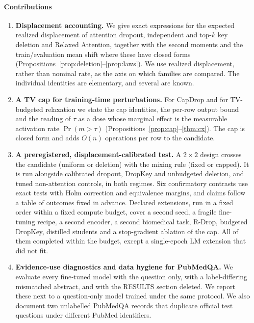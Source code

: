 \paragraph{Contributions}
\begin{enumerate}
\item \textbf{Displacement accounting.} We give exact expressions for the expected realized displacement of
attention dropout, independent and top-$k$ key deletion and Relaxed Attention, together with the
second moments and the train/evaluation mean shift where these have closed forms
(Propositions~\ref{prop:deletion}--\ref{prop:laws}). We use realized displacement, rather than
nominal rate, as the axis on which families are compared. The individual identities are elementary,
and several are known.
\item \textbf{A TV cap for training-time perturbations.} For CapDrop and for TV-budgeted relaxation we
state the cap identities, the per-row output bound and the reading of $\tau$ as a dose whose
marginal effect is the measurable activation rate $\Pr(m>\tau)$ (Propositions~\ref{prop:cap}--\ref{thm:cx}).
The cap is closed form and adds $O(n)$ operations per row to the candidate.
\item \textbf{A preregistered, displacement-calibrated test.} A $2\times2$ design crosses the candidate
(uniform or deletion) with the mixing rule (fixed or capped). It is run alongside calibrated dropout,
DropKey and unbudgeted deletion, and tuned non-attention controls, in both regimes. Six confirmatory
contrasts use exact tests with Holm correction and equivalence margins, and claims follow a table of
outcomes fixed in advance. Declared extensions, run in a fixed order within a fixed compute budget,
cover a second seed, a fragile fine-tuning recipe, a second encoder, a second biomedical task,
R-Drop, budgeted DropKey, distilled students and a stop-gradient ablation of the cap. All of them completed within the budget, except a
single-epoch LM extension that did not fit.
\item \textbf{Evidence-use diagnostics and data hygiene for PubMedQA.} We evaluate every fine-tuned
model with the question only, with a label-differing mismatched abstract, and with the RESULTS
section deleted. We report these next to a question-only model trained under the same protocol. We also
document two unlabelled PubMedQA records that duplicate official test questions under different
PubMed identifiers.
\end{enumerate}

